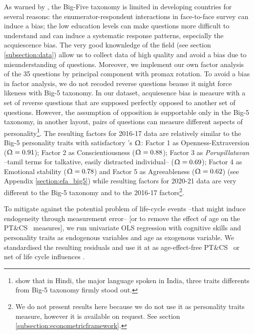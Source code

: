 \documentclass[a4paper, 11pt, onecolumn]{article}
\newcommand{\PTCS}{PT\&CS}
\begin{document}
As warned by \cite{Laajaj2019}, the Big-Five taxonomy is limited in developing countries for several reasons: the enumerator-respondent interactions in face-to-face survey can induce a bias; the low education levels can make questions more difficult to understand and can induce a systematic response patterns, especially the acquiescence bias.
The very good knownledge of the field (see section \ref{subsection:data}) allow us to collect data of high quality and avoid a bias due to misunderstanding of questions.
Moreover, we implement our own factor analysis of the 35 questions by principal component with promax rotation.
To avoid a bias in factor analysis, we do not recoded reverse questions beause it might force likeness with Big-5 taxonomy.
In our dataset, acquiesence bias is measure with a set of reverse questions that are supposed perfectly opposed to another set of questions. 
However, the assumption of opposition is supportable only in the Big-5 taxonomy, in another layout, pairs of questions can measure different aspects of personality\footnote{\cite{Singh2013} show that in Hindi, the major language spoken in India, three traits differents from Big-5 taxonomy firmly stood out.}.
The resulting factors for 2016-17 data are relatively similar to the Big-5 personality traits with satisfactory \citeauthor{McDonald1999}'s $\Upomega$: Factor 1 as Openness-Extraversion ($\Upomega=0.91$); Factor 2 as Conscientiousness ($\Upomega=0.88$); Factor 3 as \textit{Porupillatavan} --tamil terms for talkative, easily distracted individual-- ($\Upomega=0.69$); Factor 4 as Emotional stability ($\Upomega=0.78$) and Factor 5 as Agreeableness ($\Upomega=0.62$) (see Appendix \ref{section:efa_big5}) while resulting factors for 2020-21 data are very different to the Big-5 taxonomy and to the 2016-17 factors\footnote{We do not present results here because we do not use it as personality traits measure, however it is available on request. See section \ref{subsection:econometricframework}.}.

To mitigate against the potential problem of life-cycle events --that might induce endogeneity through measurement error-- [or to remove the effect of age on the \PTCS~ measures], we run univariate OLS regression with cognitive skills and personality traits as endogenous variables and age as exogenous variable. %
We standardised the resulting residuals and use it at as age-effect-free \PTCS~ or net of life cycle influences \citep{Nyhus2005, Brown2014, Groves2005}. 
\end{document}

